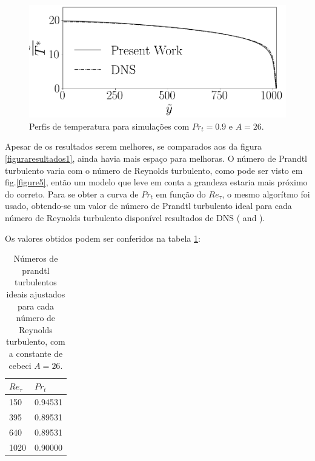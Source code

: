 \begin{figure}[!h]
\begin{minipage}[t]{0.5\textwidth}
	\end{minipage}
	\begin{minipage}[t]{0.45\textwidth}
		\centering
		\includegraphics[angle=0, scale=0.34]{fotos_formatacao_final/Temperature_1000_071_Prt0905_A26}
	\end{minipage}	
	\caption{Perfis de temperatura para simulações com $Pr_t = 0.9 $ e $A = 26$.}
	\label{primeiros}
\end{figure}

Apesar de os resultados serem melhores, se comparados aos da figura \ref{figuraresultados1}, ainda havia mais espaço para melhoras. O número de Prandtl turbulento varia com o número de Reynolds turbulento, como pode ser visto em fig.\ref{figure5}, então um modelo que leve em conta a grandeza estaria mais próximo do correto. 
Para se obter a curva de $Pr_t$ em função do $Re_\tau$, o mesmo algorítmo foi usado, obtendo-se um valor de número de Prandtl turbulento ideal para cada número de Reynolds turbulento disponível resultados de DNS (\cite{dns1020} and \cite{dns150}).

Os valores obtidos podem ser conferidos na tabela \ref{tabela1}:

\begin{table}[!h]
	\centering
	\caption{Números de prandtl turbulentos ideais ajustados para cada número de Reynolds turbulento, com a constante de cebeci $A = 26$.}
	\begin{tabular}{ll}
		  \hline
		  $Re_\tau$ & $Pr_t$\\
		  \hline
		  150  &   0.94531\\
		  395  &   0.89531\\
		  640  &   0.89531\\
		  1020 &   0.90000\\ 
		  \hline
	\end{tabular}
	\label{tabela1}
\end{table}

